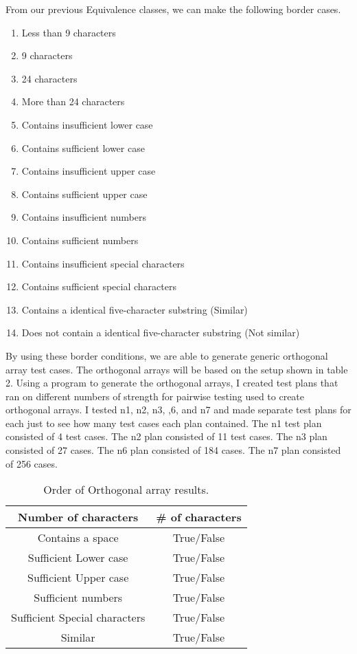 \documentclass[12pt,letterpaper]{article}
\begin{document}
From our previous Equivalence classes, we can make the following border cases.

\begin{enumerate}
\item Less than 9 characters
\item 9 characters
\item 24 characters
\item More than 24 characters
\item Contains insufficient lower case
\item Contains sufficient lower case
\item Contains insufficient upper case
\item Contains sufficient upper case
\item Contains insufficient numbers
\item Contains sufficient numbers
\item Contains insufficient special characters
\item Contains sufficient special characters
\item Contains a identical five-character substring (Similar)
\item Does not contain a identical five-character substring (Not similar)
\end{enumerate}

By using these border conditions, we are able to generate generic orthogonal array test cases.  The orthogonal arrays will be based on the setup
shown in table 2. Using a program to generate the orthogonal arrays, I created test plans that ran on different numbers of
strength for pairwise testing used to create orthogonal arrays. I tested n1, n2, n3, ,6, and n7 and made separate test plans for each
just to see how many test cases each plan contained. The n1 test plan consisted of 4 test cases. The n2 plan consisted of 11 test cases.
The n3 plan consisted of 27 cases. The n6 plan consisted of 184 cases. The n7 plan consisted of 256 cases.

\begin{table}[h!]
  \begin{center}
    \caption{Order of Orthogonal array results.}
    \label{tab:table1}
    
    \begin{tabular}{||c|c||}
    \hline
	Number of characters & \# of characters \\
	\hline
	Contains a space & True/False \\
	\hline
	Sufficient Lower case & True/False \\
	\hline
	Sufficient Upper case& True/False \\
	\hline
	Sufficient numbers & True/False \\
	\hline
	Sufficient Special characters & True/False \\
	Similar & True/False \\
    \hline
    \end{tabular}
  \end{center}
\end{table}
\end{document}
